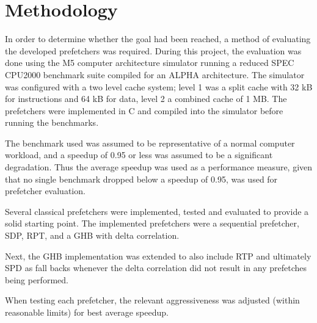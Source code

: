 \section{Methodology}
\label{sec:methodology}

In order to determine whether the goal had been reached, a method of evaluating the developed prefetchers was required.
During this project, the evaluation was done using the M5 computer architecture simulator running a reduced SPEC CPU2000 benchmark suite compiled for an ALPHA architecture.
The simulator was configured with a two level cache system; level 1 was a split cache with 32 kB for instructions and 64 kB for data, level 2 a combined cache of 1 MB.
The prefetchers were implemented in C and compiled into the simulator before running the benchmarks.

The benchmark used was assumed to be representative of a normal computer workload, and a speedup of 0.95 or less was assumed to be a significant degradation.
Thus the average speedup was used as a performance measure, given that no single benchmark dropped below a speedup of 0.95, was used for prefetcher evaluation.

Several classical prefetchers were implemented, tested and evaluated to provide a solid starting point.
The implemented prefetchers were a sequential prefetcher, SDP, RPT, and a GHB with delta correlation.

Next, the GHB implementation was extended to also include RTP and ultimately SPD as fall backs whenever the delta correlation did not result in any prefetches being performed.

When testing each prefetcher, the relevant aggressiveness was adjusted (within reasonable limits) for best average speedup.
